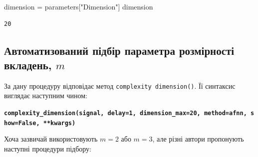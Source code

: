 \documentclass[
  letterpaper,
]{report}
\newenvironment{Shaded}{\begin{snugshade}}{\end{snugshade}}
\newcommand{\NormalTok}[1]{\textcolor[rgb]{0.00,0.23,0.31}{#1}}
\newcommand{\OperatorTok}[1]{\textcolor[rgb]{0.37,0.37,0.37}{#1}}
\newcommand{\StringTok}[1]{\textcolor[rgb]{0.13,0.47,0.30}{#1}}
\begin{document}
\begin{Shaded}
\begin{Highlighting}[]
\NormalTok{dimension }\OperatorTok{=}\NormalTok{ parameters[}\StringTok{"Dimension"}\NormalTok{]}
\NormalTok{dimension}
\end{Highlighting}
\end{Shaded}

\begin{verbatim}
20
\end{verbatim}

\hypertarget{ux430ux432ux442ux43eux43cux430ux442ux438ux437ux43eux432ux430ux43dux438ux439-ux43fux456ux434ux431ux456ux440-ux43fux430ux440ux430ux43cux435ux442ux440ux430-ux440ux43eux437ux43cux456ux440ux43dux43eux441ux442ux456-ux432ux43aux43bux430ux434ux435ux43dux44c-m}{%
\subsection{\texorpdfstring{Автоматизований підбір параметра розмірності
вкладень,
\(m\)}{Автоматизований підбір параметра розмірності вкладень, m}}\label{ux430ux432ux442ux43eux43cux430ux442ux438ux437ux43eux432ux430ux43dux438ux439-ux43fux456ux434ux431ux456ux440-ux43fux430ux440ux430ux43cux435ux442ux440ux430-ux440ux43eux437ux43cux456ux440ux43dux43eux441ux442ux456-ux432ux43aux43bux430ux434ux435ux43dux44c-m}}

За дану процедуру відповідає метод \texttt{complexity\ dimension()}. Її
синтаксис виглядає наступним чином:

\textbf{\texttt{complexity\_dimension(signal,\ delay=1,\ dimension\_max=20,\ method=\textquotesingle{}afnn\textquotesingle{},\ show=False,\ **kwargs)}}

Хоча зазвичай використовують \(m=2\) або \(m=3\), але різні автори
пропонують наступні процедури підбору:
\end{document}
